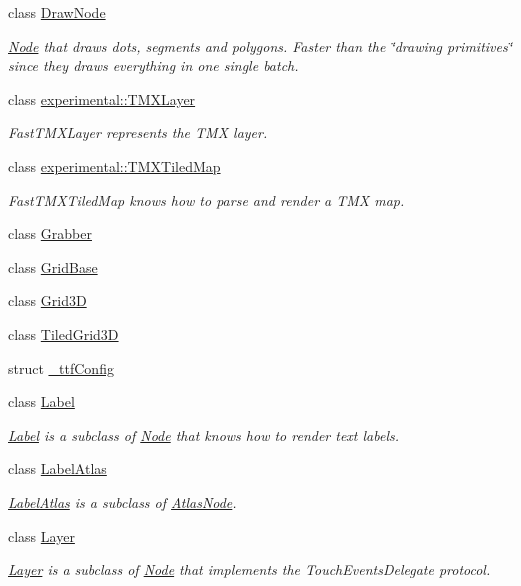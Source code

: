 \begin{DoxyCompactItemize}
class \hyperlink{classDrawNode}{Draw\+Node}
\begin{DoxyCompactList}\small\item\em \hyperlink{classNode}{Node} that draws dots, segments and polygons. Faster than the \char`\"{}drawing primitives\char`\"{} since they draws everything in one single batch. \end{DoxyCompactList}\item 
class \hyperlink{classexperimental_1_1TMXLayer}{experimental\+::\+T\+M\+X\+Layer}
\begin{DoxyCompactList}\small\item\em Fast\+T\+M\+X\+Layer represents the T\+MX layer. \end{DoxyCompactList}\item 
class \hyperlink{classexperimental_1_1TMXTiledMap}{experimental\+::\+T\+M\+X\+Tiled\+Map}
\begin{DoxyCompactList}\small\item\em Fast\+T\+M\+X\+Tiled\+Map knows how to parse and render a T\+MX map. \end{DoxyCompactList}\item 
class \hyperlink{classGrabber}{Grabber}
\item 
class \hyperlink{classGridBase}{Grid\+Base}
\item 
class \hyperlink{classGrid3D}{Grid3D}
\item 
class \hyperlink{classTiledGrid3D}{Tiled\+Grid3D}
\item 
struct \hyperlink{struct__ttfConfig}{\+\_\+ttf\+Config}
\item 
class \hyperlink{classLabel}{Label}
\begin{DoxyCompactList}\small\item\em \hyperlink{classLabel}{Label} is a subclass of \hyperlink{classNode}{Node} that knows how to render text labels. \end{DoxyCompactList}\item 
class \hyperlink{classLabelAtlas}{Label\+Atlas}
\begin{DoxyCompactList}\small\item\em \hyperlink{classLabelAtlas}{Label\+Atlas} is a subclass of \hyperlink{classAtlasNode}{Atlas\+Node}. \end{DoxyCompactList}\item 
class \hyperlink{classLayer}{Layer}
\begin{DoxyCompactList}\small\item\em \hyperlink{classLayer}{Layer} is a subclass of \hyperlink{classNode}{Node} that implements the Touch\+Events\+Delegate protocol. \end{DoxyCompactList}\item 

\end{DoxyCompactItemize}
